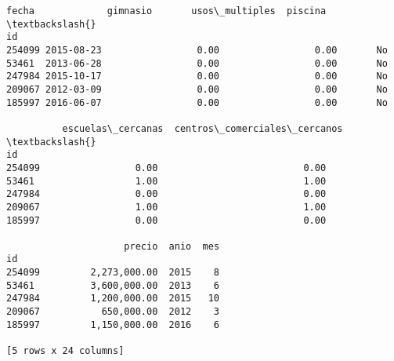 \documentclass[11pt]{article}
\begin{document}
\begin{tcolorbox}[breakable, boxrule=.5pt, size=fbox, pad at break*=1mm, opacityfill=0]
\begin{Verbatim}[commandchars=\\\{\}]
            fecha             gimnasio       usos\_multiples  piscina  \textbackslash{}
id
254099 2015-08-23                 0.00                 0.00       No
53461  2013-06-28                 0.00                 0.00       No
247984 2015-10-17                 0.00                 0.00       No
209067 2012-03-09                 0.00                 0.00       No
185997 2016-06-07                 0.00                 0.00       No

          escuelas\_cercanas  centros\_comerciales\_cercanos  \textbackslash{}
id
254099                 0.00                          0.00
53461                  1.00                          1.00
247984                 0.00                          0.00
209067                 1.00                          1.00
185997                 0.00                          0.00

                     precio  anio  mes
id
254099         2,273,000.00  2015    8
53461          3,600,000.00  2013    6
247984         1,200,000.00  2015   10
209067           650,000.00  2012    3
185997         1,150,000.00  2016    6

[5 rows x 24 columns]
\end{Verbatim}
\end{tcolorbox}
        
\end{document}
